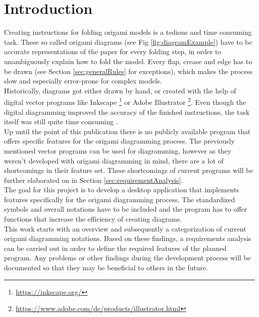 
\section{Introduction}
\label{sec:introduction}

Creating instructions for folding \gls{origami} models is a tedious and time consuming task. These so called origami diagrams (see Fig \ref{fig:diagramExample}) have to be accurate representations of the paper for every folding step, in order to unambiguously explain how to fold the model. Every flap, crease and edge has to be drawn (see Section \ref{sec:generalRules} for exceptions), which makes the process slow and especially error-prone for complex models.\\
Historically, diagrams got either drawn by hand, or created with the help of digital vector programs like Inkscape \footnote{\url{https://inkscape.org/}} or Adobe Illustrator \footnote{\url{https://www.adobe.com/de/products/illustrator.html}}. Even though the digital diagramming improved the accuracy of the finished instructions, the task itself was still quite time consuming \cite{???}.\\
Up until the point of this publication there is no publicly available program that offers specific features for the origami diagramming process. The previously mentioned vector programs can be used for diagramming, however as they weren't developed with origami diagramming in mind, there are a lot of shortcomings in their feature set. These shortcomings of current programs will be further elaborated on in Section \ref{sec:requirementAnalysis}.\\
The goal for this project is to develop a desktop application that implements features specifically for the origami diagramming process. The standardized symbols and overall notations have to be included and the program has to offer functions that increase the efficiency of creating diagrams.\\
This work starts with an overview and subsequently a categorization of current origami diagramming notations. Based on these findings, a requirements analysis can be carried out in order to define the required features of the planned program. Any problems or other findings during the development process will be documented so that they may be beneficial to others in the future.